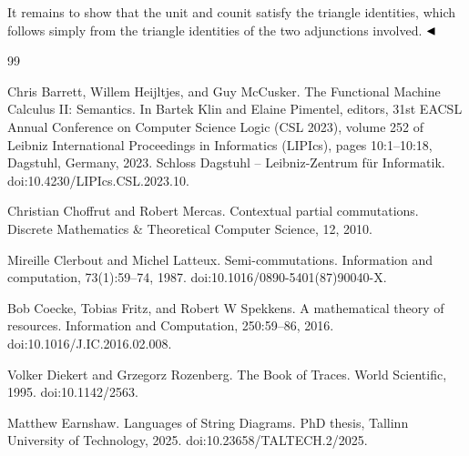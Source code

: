 \documentclass[10pt,a4paper]{article}
\begin{document}
 
 
It remains to show that the unit and counit satisfy the triangle identities, which follows simply from the triangle identities of the two adjunctions involved. $\hfill\blacktriangleleft$\par
 
 
 
\par
 
 
 

\begin{thebibliography}{99}
\par\noindent    Chris Barrett, Willem Heijltjes, and Guy McCusker.  The Functional Machine Calculus II: Semantics.  In Bartek Klin and Elaine Pimentel, editors, 31st EACSL Annual Conference on Computer Science Logic (CSL 2023), volume 252 of Leibniz International Proceedings in Informatics (LIPIcs), pages 10:1--10:18, Dagstuhl, Germany, 2023. Schloss Dagstuhl -- Leibniz-Zentrum für Informatik.  doi:10.4230/LIPIcs.CSL.2023.10.  

\par\noindent    Christian Choffrut and Robert Mercas.  Contextual partial commutations.  Discrete Mathematics \& Theoretical Computer Science, 12, 2010.  

\par\noindent    Mireille Clerbout and Michel Latteux.  Semi-commutations.  Information and computation, 73(1):59--74, 1987.  doi:10.1016/0890-5401(87)90040-X.  

\par\noindent    Bob Coecke, Tobias Fritz, and Robert W Spekkens.  A mathematical theory of resources.  Information and Computation, 250:59--86, 2016.  doi:10.1016/J.IC.2016.02.008.  

\par\noindent    Volker Diekert and Grzegorz Rozenberg.  The Book of Traces.  World Scientific, 1995.  doi:10.1142/2563.  

\par\noindent    Matthew Earnshaw.  Languages of String Diagrams.  PhD thesis, Tallinn University of Technology, 2025.  doi:10.23658/TALTECH.2/2025.  


\end{thebibliography}
\end{document}
